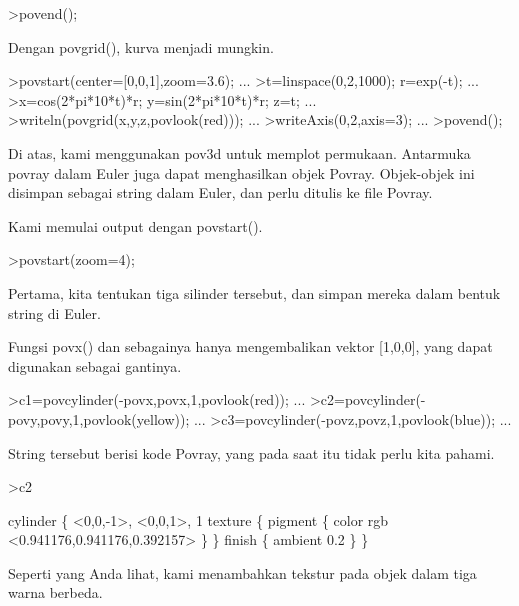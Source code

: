 \begin{eulercomment}
\begin{eulerprompt}
>povend();
\end{eulerprompt}
\begin{eulercomment}
Dengan povgrid(), kurva menjadi mungkin.
\end{eulercomment}
\begin{eulerprompt}
>povstart(center=[0,0,1],zoom=3.6); ...
>t=linspace(0,2,1000); r=exp(-t); ...
>x=cos(2*pi*10*t)*r; y=sin(2*pi*10*t)*r; z=t; ...
>writeln(povgrid(x,y,z,povlook(red))); ...
>writeAxis(0,2,axis=3); ...
>povend();
\end{eulerprompt}
\begin{eulercomment}
Di atas, kami menggunakan pov3d untuk memplot permukaan. Antarmuka
povray dalam Euler juga dapat menghasilkan objek Povray. Objek-objek
ini disimpan sebagai string dalam Euler, dan perlu ditulis ke file
Povray.

Kami memulai output dengan povstart().
\end{eulercomment}
\begin{eulerprompt}
>povstart(zoom=4);
\end{eulerprompt}
\begin{eulercomment}
Pertama, kita tentukan tiga silinder tersebut, dan simpan mereka dalam
bentuk string di Euler.

Fungsi povx() dan sebagainya hanya mengembalikan vektor [1,0,0], yang
dapat digunakan sebagai gantinya.
\end{eulercomment}
\begin{eulerprompt}
>c1=povcylinder(-povx,povx,1,povlook(red)); ...
>c2=povcylinder(-povy,povy,1,povlook(yellow)); ...
>c3=povcylinder(-povz,povz,1,povlook(blue)); ...
\end{eulerprompt}
\begin{eulercomment}
String tersebut berisi kode Povray, yang pada saat itu tidak perlu
kita pahami.
\end{eulercomment}
\begin{eulerprompt}
>c2
\end{eulerprompt}
\begin{euleroutput}
  cylinder \{ <0,0,-1>, <0,0,1>, 1
   texture \{ pigment \{ color rgb <0.941176,0.941176,0.392157> \}  \} 
   finish \{ ambient 0.2 \} 
   \}
\end{euleroutput}
\begin{eulercomment}
Seperti yang Anda lihat, kami menambahkan tekstur pada objek dalam
tiga warna berbeda.


\end{eulercomment}
\end{eulercomment}
